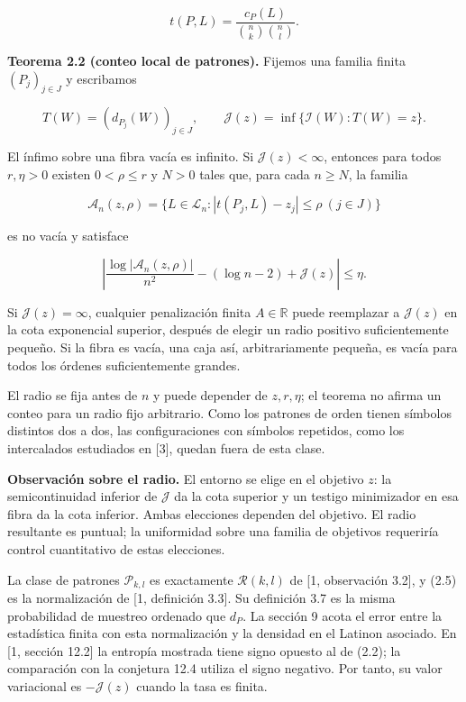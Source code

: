 \documentclass[spanish,11pt,a4paper]{article}
\begin{document}
\nopagebreak[4]
\[t(P,L)=\frac{c_P(L)}{\binom nk\binom nl}.\tag{2.5}\]

\textbf{Teorema 2.2 (conteo local de patrones).} Fijemos una familia finita \((P_j)_{j\in J}\) y escribamos

\nopagebreak[4]
\[T(W)=(d_{P_j}(W))_{j\in J},\qquad
\mathcal J(z)=\inf\{\mathcal I(W):T(W)=z\}.\tag{2.6}\]

El ínfimo sobre una fibra vacía es infinito. Si \(\mathcal J(z)<\infty\), entonces para todos \(r,\eta>0\) existen \(0<\rho\le r\) y \(N>0\) tales que, para cada \(n\ge N\), la familia

\nopagebreak[4]
\[\mathcal A_n(z,\rho)=\{L\in\mathcal L_n:|t(P_j,L)-z_j|\le\rho\ (j\in J)\}\tag{2.7}\]

es no vacía y satisface

\nopagebreak[4]
\[\left|\frac{\log|\mathcal A_n(z,\rho)|}{n^2}-(\log n-2)+\mathcal J(z)\right|\le\eta.\tag{2.8}\]

Si \(\mathcal J(z)=\infty\), cualquier penalización finita \(A\in\mathbb R\) puede reemplazar a \(\mathcal J(z)\) en la cota exponencial superior, después de elegir un radio positivo suficientemente pequeño. Si la fibra es vacía, una caja así, arbitrariamente pequeña, es vacía para todos los órdenes suficientemente grandes.

El radio se fija antes de \(n\) y puede depender de \(z,r,\eta\); el teorema no afirma un conteo para un radio fijo arbitrario. Como los patrones de orden tienen símbolos distintos dos a dos, las configuraciones con símbolos repetidos, como los intercalados estudiados en {[}3{]}, quedan fuera de esta clase.

\textbf{Observación sobre el radio.} El entorno se elige en el objetivo \(z\): la semicontinuidad inferior de \(\mathcal J\) da la cota superior y un testigo minimizador en esa fibra da la cota inferior. Ambas elecciones dependen del objetivo. El radio resultante es puntual; la uniformidad sobre una familia de objetivos requeriría control cuantitativo de estas elecciones.

La clase de patrones \(\mathcal P_{k,l}\) es exactamente \(\mathcal R(k,l)\) de {[}1, observación 3.2{]}, y (2.5) es la normalización de {[}1, definición 3.3{]}. Su definición 3.7 es la misma probabilidad de muestreo ordenado que \(d_P\). La sección 9 acota el error entre la estadística finita con esta normalización y la densidad en el Latinon asociado. En {[}1, sección 12.2{]} la entropía mostrada tiene signo opuesto al de (2.2); la comparación con la conjetura 12.4 utiliza el signo negativo. Por tanto, su valor variacional es \(-\mathcal J(z)\) cuando la tasa es finita.
\end{document}
